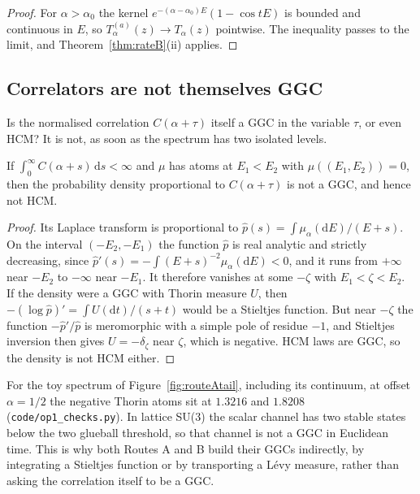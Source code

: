 \begin{proof}
For $\alpha>\alpha_0$ the kernel $e^{-(\alpha-\alpha_0)E}(1-\cos tE)$ is bounded and continuous in $E$, so $T^{(a)}_\alpha(z)\to T_\alpha(z)$ pointwise. The inequality passes to the limit, and Theorem~\ref{thm:rateB}(ii) applies.
\end{proof}

\subsection{Correlators are not themselves GGC}

Is the normalised correlation $C(\alpha+\tau)$ itself a GGC in the variable $\tau$, or even HCM? It is not, as soon as the spectrum has two isolated levels.

\begin{proposition}\label{prop:notggcB}
If $\int_0^\infty C(\alpha+s)\,\mathrm ds<\infty$ and $\mu$ has atoms at $E_1<E_2$ with $\mu((E_1,E_2))=0$, then the probability density proportional to $C(\alpha+\tau)$ is not a GGC, and hence not HCM.
\end{proposition}

\begin{proof}
Its Laplace transform is proportional to $\widehat p(s)=\int\mu_\alpha(\mathrm dE)/(E+s)$. On the interval $(-E_2,-E_1)$ the function $\widehat p$ is real analytic and strictly decreasing, since $\widehat p'(s)=-\int(E+s)^{-2}\mu_\alpha(\mathrm dE)<0$, and it runs from $+\infty$ near $-E_2$ to $-\infty$ near $-E_1$. It therefore vanishes at some $-\zeta$ with $E_1<\zeta<E_2$. If the density were a GGC with Thorin measure $U$, then $-(\log\widehat p)'=\int U(\mathrm dt)/(s+t)$ would be a Stieltjes function. But near $-\zeta$ the function $-\widehat p'/\widehat p$ is meromorphic with a simple pole of residue $-1$, and Stieltjes inversion then gives $U=-\delta_\zeta$ near $\zeta$, which is negative. HCM laws are GGC, so the density is not HCM either.
\end{proof}

For the toy spectrum of Figure~\ref{fig:routeAtail}, including its continuum, at offset $\alpha=1/2$ the negative Thorin atoms sit at $1.3216$ and $1.8208$ (\texttt{code/op1\_checks.py}). In lattice SU(3) the scalar channel has two stable states below the two glueball threshold\cite{MP}, so that channel is not a GGC in Euclidean time. This is why both Routes A and B build their GGCs indirectly, by integrating a Stieltjes function or by transporting a L\'evy measure, rather than asking the correlation itself to be a GGC.

